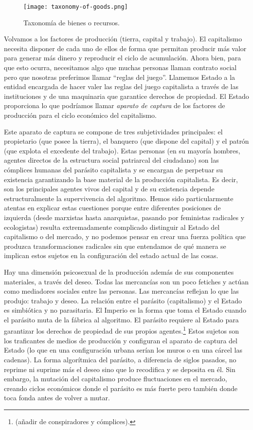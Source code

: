 \begin{figure}[htbp]
	\centering
	\texttt{[image: taxonomy-of-goods.png]}
	\caption{Taxonomía de bienes o recursos.}
	\label{fig:taxres}
\end{figure}

Volvamos a los factores de producción (tierra, capital y trabajo). El capitalismo necesita disponer de cada uno de ellos de forma que permitan producir más valor para generar más dinero y reproducir el ciclo de acumulación. Ahora bien, para que esto ocurra, necesitamos algo que muchas personas llaman contrato social pero que nosotras preferimos llamar \enquote{reglas del juego}.\revquotes{} Llamemos Estado a la entidad encargada de hacer valer las reglas del juego capitalista a través de las instituciones y de una maquinaria que garantice derechos de propiedad. El Estado proporciona lo que podríamos llamar \emph{aparato de captura} de los factores de producción para el ciclo económico del capitalismo.

Este aparato de captura se compone de tres subjetividades principales: el propietario (que posee la tierra), el banquero (que dispone del capital) y el patrón (que explota el excedente del trabajo). Estas personas (en su mayoría hombres, agentes directos de la estructura social patriarcal del ciudadano) son las cómplices humanas del parásito capitalista y se encargan de perpetuar su existencia garantizando la base material de la producción capitalista. Es decir, son los principales agentes vivos del capital y de su existencia depende estructuralmente la supervivencia del algoritmo. Hemos sido particularmente atentas en explicar estas cuestiones porque entre diferentes posiciones de izquierda (desde marxistas hasta anarquistas, pasando por feministas radicales y ecologistas) resulta extremadamente complicado distinguir al Estado del capitalismo o del mercado, y no podemos pensar en crear una fuerza política que produzca transformaciones radicales sin que entendamos de qué manera se implican estos sujetos en la configuración del estado actual de las cosas.

Hay una dimensión psicosexual de la producción además de sus componentes materiales, a través del deseo. Todas las mercancías son un poco fetiches y actúan como mediadores sociales entre las personas. Las mercancías reflejan lo que las produjo: trabajo y deseo. La relación entre el parásito (capitalismo) y el Estado es simbiótica y no parasitaria. El Imperio es la forma que toma el Estado cuando el parásito muta de la fábrica al algoritmo. El parásito requiere al Estado para garantizar los derechos de propiedad de sus propios agentes.\footnote{(añadir de conspiradores y cómplices).} Estos sujetos son los traficantes de medios de producción y configuran el aparato de captura del Estado (lo que en una configuración urbana serían los muros o en una cárcel las cadenas). La forma algorítmica del parásito, a diferencia de siglos pasados, no reprime ni suprime más el deseo sino que lo recodifica y se deposita en él. Sin embargo, la mutación del capitalismo produce fluctuaciones en el mercado, creando ciclos económicos donde el parásito es más fuerte pero también donde toca fonda antes de volver a mutar.

